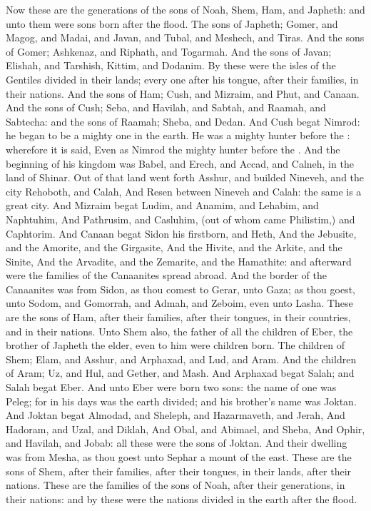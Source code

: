 \begin{biblechapter} %
 Now these are the generations of the sons of Noah, Shem, Ham, and Japheth: and unto them were sons born after the flood.
 The sons of Japheth; Gomer, and Magog, and Madai, and Javan, and Tubal, and Meshech, and Tiras.
\verse And the sons of Gomer; Ashkenaz, and Riphath, and Togarmah.
\verse And the sons of Javan; Elishah, and Tarshish, Kittim, and Dodanim.
\verse By these were the isles of the Gentiles divided in their lands; every one after his tongue, after their families, in their nations.
 And the sons of Ham; Cush, and Mizraim, and Phut, and Canaan.
\verse And the sons of Cush; Seba, and Havilah, and Sabtah, and Raamah, and Sabtecha: and the sons of Raamah; Sheba, and Dedan.
\verse And Cush begat Nimrod: he began to be a mighty one in the earth.
\verse He was a mighty hunter before the \LORD: wherefore it is said, Even as Nimrod the mighty hunter before the \LORD.
\verse And the beginning of his kingdom was Babel, and Erech, and Accad, and Calneh, in the land of Shinar.
\verse Out of that land went forth Asshur, and builded Nineveh, and the city Rehoboth, and Calah,
\verse And Resen between Nineveh and Calah: the same is a great city.
\verse And Mizraim begat Ludim, and Anamim, and Lehabim, and Naphtuhim,
\verse And Pathrusim, and Casluhim, (out of whom came Philistim,) and Caphtorim.
\verse And Canaan begat Sidon his firstborn, and Heth,
\verse And the Jebusite, and the Amorite, and the Girgasite,
\verse And the Hivite, and the Arkite, and the Sinite,
\verse And the Arvadite, and the Zemarite, and the Hamathite: and afterward were the families of the Canaanites spread abroad.
\verse And the border of the Canaanites was from Sidon, as thou comest to Gerar, unto Gaza; as thou goest, unto Sodom, and Gomorrah, and Admah, and Zeboim, even unto Lasha.
\verse These are the sons of Ham, after their families, after their tongues, in their countries, and in their nations.
 Unto Shem also, the father of all the children of Eber, the brother of Japheth the elder, even to him were children born.
\verse The children of Shem; Elam, and Asshur, and Arphaxad, and Lud, and Aram.
\verse And the children of Aram; Uz, and Hul, and Gether, and Mash.
\verse And Arphaxad begat Salah; and Salah begat Eber.
\verse And unto Eber were born two sons: the name of one was Peleg; for in his days was the earth divided; and his brother's name was Joktan.
\verse And Joktan begat Almodad, and Sheleph, and Hazarmaveth, and Jerah,
\verse And Hadoram, and Uzal, and Diklah,
\verse And Obal, and Abimael, and Sheba,
\verse And Ophir, and Havilah, and Jobab: all these were the sons of Joktan.
\verse And their dwelling was from Mesha, as thou goest unto Sephar a mount of the east.
\verse These are the sons of Shem, after their families, after their tongues, in their lands, after their nations.
\verse These are the families of the sons of Noah, after their generations, in their nations: and by these were the nations divided in the earth after the flood.
\end{biblechapter}

